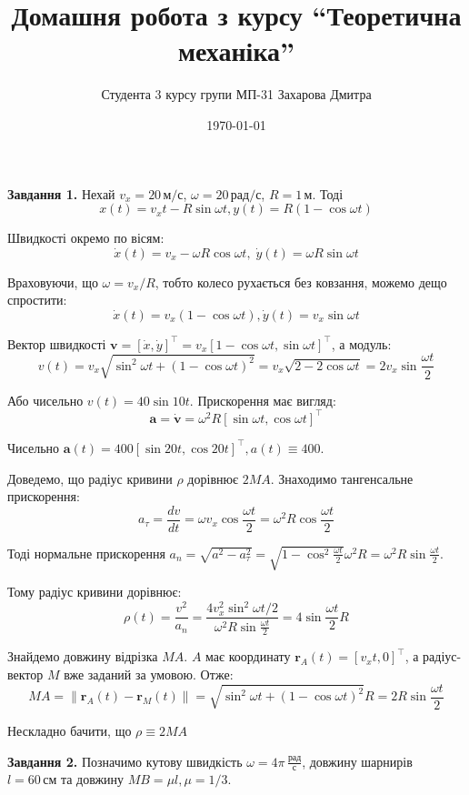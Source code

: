 \documentclass[12pt]{extarticle}
\title{Домашня робота з курсу ``Теоретична механіка''}
\author{Студента 3 курсу групи МП-31 Захарова Дмитра}
\date{\today}
\begin{document}
\maketitle

\textbf{Завдання 1.} Нехай $v_x=20 \, \text{м}/\text{с}$, $\omega=20 \, \text{рад}/\text{с}$, $R=1 \, \text{м}$. Тоді 
\[
x(t) = v_xt - R \sin \omega t, y(t) = R(1 - \cos \omega t)
\]

Швидкості окремо по вісям:
\[
\dot{x}(t) = v_x - \omega R \cos \omega t, \; \dot{y}(t) = \omega R \sin \omega t
\]

Враховуючи, що $\omega = v_x/R$, тобто колесо рухається без ковзання, можемо дещо спростити:
\[
\dot{x}(t) = v_x(1-\cos \omega t), \dot{y}(t) = v_x \sin \omega t
\]

Вектор швидкості $\boldsymbol{v} = [\dot{x},\dot{y}]^{\top} = v_x[1 - \cos \omega t, \sin \omega t]^{\top}$, а модуль:
\[
v(t) = v_x \sqrt{\sin^2 \omega t + (1-\cos \omega t)^2} = v_x \sqrt{2 - 2 \cos \omega t} = 2v_x \sin \frac{\omega t}{2}
\]

Або чисельно $v(t)=40 \sin 10 t$. Прискорення має вигляд:
\[
\boldsymbol{a} = \dot{\boldsymbol{v}} = \omega^2 R[\sin \omega t, \cos \omega t]^{\top}
\]

Чисельно $\boldsymbol{a}(t) = 400[\sin 20t, \cos 20t]^{\top}, a(t) \equiv 400$. 

Доведемо, що радіус кривини $\rho$ дорівнює $2MA$. Знаходимо тангенсальне прискорення:
\[
a_{\tau} = \frac{dv}{dt} = \omega v_x \cos \frac{\omega t}{2} = \omega^2 R \cos \frac{\omega t}{2}
\]

Тоді нормальне прискорення $a_n = \sqrt{a^2-a_{\tau}^2} = \sqrt{1 - \cos^2 \frac{\omega t}{2}}\omega^2R = \omega^2 R \sin \frac{\omega t}{2}$. 

Тому радіус кривини дорівнює:
\[
\rho(t) = \frac{v^2}{a_n} = \frac{4v_x^2 \sin^2 \omega t/2}{\omega^2 R \sin \frac{\omega t}{2}} = 4 \sin \frac{\omega t}{2} R
\]

Знайдемо довжину відрізка $MA$. $A$ має координату $\boldsymbol{r}_A(t)=[v_xt,0]^{\top}$, а радіус-вектор $M$ вже заданий за умовою. Отже:
\[
MA = \|\boldsymbol{r}_A(t)-\boldsymbol{r}_M(t)\| =  \sqrt{\sin^2 \omega t + (1-\cos\omega t)^2}R = 2R \sin \frac{\omega t}{2}
\]

Нескладно бачити, що $\rho \equiv 2MA$

\textbf{Завдання 2.} Позначимо кутову швидкість $\omega=4\pi \, \frac{\text{рад}}{\text{с}}$, довжину шарнирів $l=60 \, \text{см}$ та довжину $MB=\mu l, \mu=1/3$. 
\end{document}
